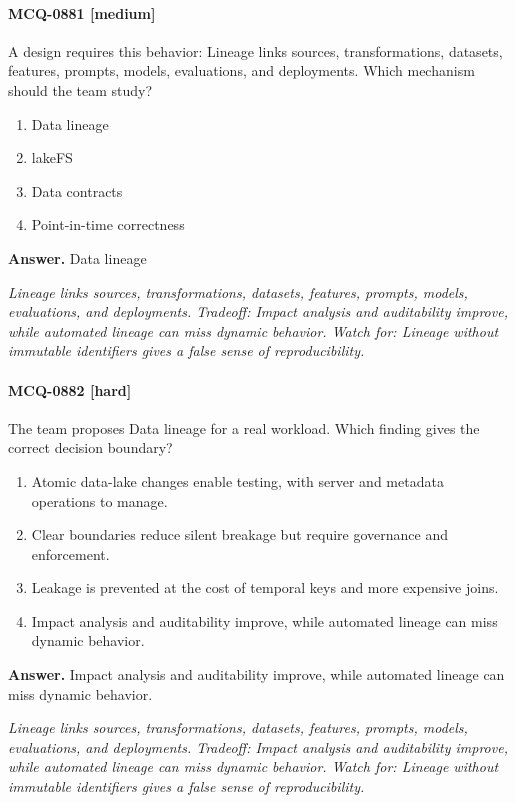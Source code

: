 \paragraph{MCQ-0881 [medium]} A design requires this behavior: Lineage links sources, transformations, datasets, features, prompts, models, evaluations, and deployments. Which mechanism should the team study?
\begin{enumerate}[label=\Alph*.]
\item Data lineage
\item lakeFS
\item Data contracts
\item Point-in-time correctness
\end{enumerate}
\noindent\textbf{Answer.} Data lineage
\par\textit{Lineage links sources, transformations, datasets, features, prompts, models, evaluations, and deployments. Tradeoff: Impact analysis and auditability improve, while automated lineage can miss dynamic behavior. Watch for: Lineage without immutable identifiers gives a false sense of reproducibility.}
\paragraph{MCQ-0882 [hard]} The team proposes Data lineage for a real workload. Which finding gives the correct decision boundary?
\begin{enumerate}[label=\Alph*.]
\item Atomic data-lake changes enable testing, with server and metadata operations to manage.
\item Clear boundaries reduce silent breakage but require governance and enforcement.
\item Leakage is prevented at the cost of temporal keys and more expensive joins.
\item Impact analysis and auditability improve, while automated lineage can miss dynamic behavior.
\end{enumerate}
\noindent\textbf{Answer.} Impact analysis and auditability improve, while automated lineage can miss dynamic behavior.
\par\textit{Lineage links sources, transformations, datasets, features, prompts, models, evaluations, and deployments. Tradeoff: Impact analysis and auditability improve, while automated lineage can miss dynamic behavior. Watch for: Lineage without immutable identifiers gives a false sense of reproducibility.}
